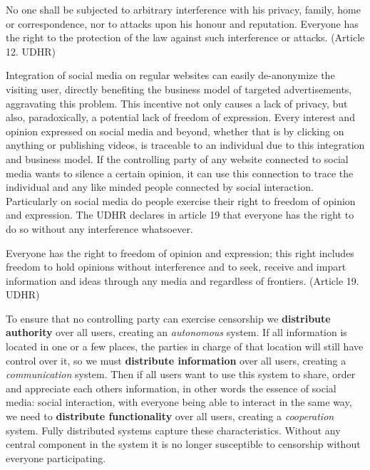 \begin{displayquote}
	No one shall be subjected to arbitrary interference with his privacy, family, home or correspondence, nor to attacks upon his honour and reputation. Everyone has the right to the protection of the law against such interference or attacks.
	(Article 12. UDHR)
\end{displayquote}

Integration of social media on regular websites can easily de-anonymize the visiting user, directly benefiting the business model of targeted advertisements, aggravating this problem.
This incentive not only causes a lack of privacy, but also, paradoxically, a potential lack of freedom of expression.
Every interest and opinion expressed on social media and beyond, whether that is by clicking on anything or publishing videos, is traceable to an individual due to this integration and business model.
If the controlling party of any website connected to social media wants to silence a certain opinion, it can use this connection to trace the individual and any like minded people connected by social interaction.
Particularly on social media do people exercise their right to freedom of opinion and expression.
The UDHR declares in article 19 that everyone has the right to do so without any interference whatsoever.

\begin{displayquote}
	Everyone has the right to freedom of opinion and expression; this right includes freedom to hold opinions without interference and to seek, receive and impart information and ideas through any media and regardless of frontiers.
	(Article 19. UDHR)
\end{displayquote}

To ensure that no controlling party can exercise censorship we \textbf{distribute authority} over all users, creating an \emph{autonomous} system.
If all information is located in one or a few places, the parties in charge of that location will still have control over it, so we must \textbf{distribute information} over all users, creating a \emph{communication} system.
Then if all users want to use this system to share, order and appreciate each others information, in other words the essence of social media: social interaction, with everyone being able to interact in the same way, we need to  \textbf{distribute functionality} over all users, creating a \emph{cooperation} system.
Fully distributed systems capture these characteristics. %
Without any central component in the system it is no longer susceptible to censorship without everyone participating.

